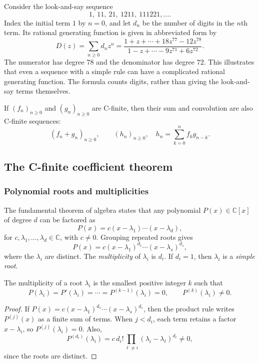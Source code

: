 \begin{example}
Consider the look-and-say sequence
\[
1,\ 11,\ 21,\ 1211,\ 111221,\ldots.
\]
Index the initial term $1$ by $n=0$, and let $d_n$ be the number of digits in the $n$th term. Its rational generating function is given in abbreviated form by
\[
D(z)=\sum_{n\ge0}d_nz^n=\frac{1+z+\cdots+18z^{77}-12z^{78}}{1-z+\cdots-9z^{71}+6z^{72}}.
\]
The numerator has degree $78$ and the denominator has degree $72$. This illustrates that even a sequence with a simple rule can have a complicated rational generating function. The formula counts digits, rather than giving the look-and-say terms themselves.
\end{example}
\begin{corollary}
If $(f_n)_{n\ge0}$ and $(g_n)_{n\ge0}$ are C-finite, then their sum and convolution are also C-finite sequences:
\[
(f_n+g_n)_{n\ge0},\qquad
(h_n)_{n\ge0},\quad h_n=\sum_{k=0}^n f_kg_{n-k}.
\]
\end{corollary}

\subsection{The C-finite coefficient theorem}
\subsubsection{Polynomial roots and multiplicities}
The fundamental theorem of algebra states that any polynomial $P(x)\in\mathbb C[x]$ of degree $d$ can be factored as
\[
P(x)=c(x-\lambda_1)\cdots(x-\lambda_d),
\]
for $c,\lambda_1,\ldots,\lambda_d\in\mathbb C$, with $c\ne0$.
Grouping repeated roots gives
\[
P(x)=c(x-\lambda_1)^{d_1}\cdots(x-\lambda_s)^{d_s},
\]
where the $\lambda_i$ are distinct. The \textit{multiplicity} of $\lambda_i$ is $d_i$. If $d_i=1$, then $\lambda_i$ is a \textit{simple root}.
\begin{lemma}
The multiplicity of a root $\lambda_i$ is the smallest positive integer $k$ such that
\[
P(\lambda_i)=P'(\lambda_i)=\cdots=P^{(k-1)}(\lambda_i)=0,
\qquad P^{(k)}(\lambda_i)\ne0.
\]
\end{lemma}
\begin{proof}
If $P(x)=c(x-\lambda_1)^{d_1}\cdots(x-\lambda_s)^{d_s}$, then the product rule writes $P^{(j)}(x)$ as a finite sum of terms. When $j<d_i$, each term retains a factor $x-\lambda_i$, so $P^{(j)}(\lambda_i)=0$. Also,
\[
P^{(d_i)}(\lambda_i)
=c\,d_i!\prod_{\ell\ne i}(\lambda_i-\lambda_\ell)^{d_\ell}\ne0,
\]
since the roots are distinct.
\end{proof}

